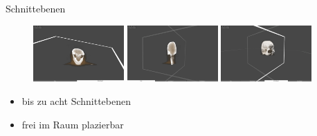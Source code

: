 \documentclass[final,hyperref={pdfpagelabels=false}]{beamer}
\begin{document}
\begin{frame}[t]
\begin{columns}[t]
\begin{column}{.465\textwidth}
\begin{block}{Schnittebenen}
   \begin{figure}
       \includegraphics[width=0.325\textwidth]{slide01}
       \vspace{10px}
       \includegraphics[width=0.325\textwidth]{slide02}
       \vspace{10px}
       \includegraphics[width=0.325\textwidth]{slide03}
   \end{figure}
%   
%   
%   
%   
%   
   \begin{itemize}
   \item bis zu acht Schnittebenen
   \item frei im Raum plazierbar
   \end{itemize}
   
     
   
   
\end{block}


\end{column} %



\begin{column}{.025\textwidth}\end{column} %

\end{columns} %



\end{frame}
\end{document}
